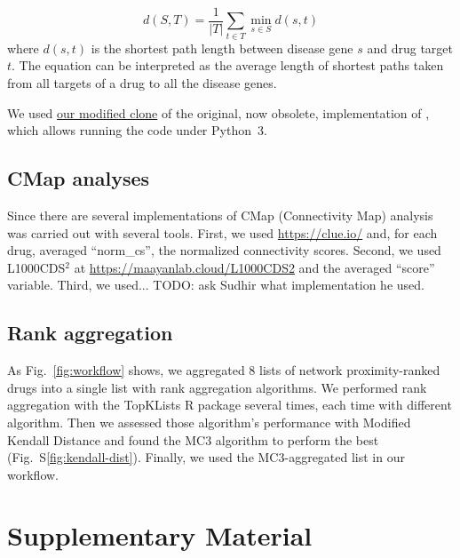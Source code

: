 \documentclass[letterpaper]{article}
\begin{document}
\begin{equation}
  d(S, T) = \frac{1}{|T|}\sum_{t \in T} \min_{s \in S} d(s, t)
\end{equation}
where $d(s,t)$ is the shortest path length between disease gene $s$ and drug
target $t$.  The equation can be interpreted as the average length of shortest
paths taken from all targets of a drug to all the disease genes.

We used \href{https://github.com/attilagk/guney_code}{our modified clone} of
the original, now obsolete, implementation of \cite{Guney2016}, which allows
running the code under Python~3.

\subsection{CMap analyses}

Since there are several implementations of CMap (Connectivity Map) analysis was carried out with several tools.  First, we used
\url{https://clue.io/} \citep{Lamb2006} and, for each drug, averaged
``norm\_cs'',
the normalized connectivity scores.  Second, we used L1000CDS$^2$ at
\url{https://maayanlab.cloud/L1000CDS2} and the averaged ``score'' variable.
Third, we used... TODO: ask Sudhir what implementation he used.

\subsection{Rank aggregation}

As Fig.~\ref{fig:workflow} shows, we aggregated 8 lists of network
proximity-ranked drugs into a single list with rank aggregation algorithms.
We performed rank aggregation with the TopKLists R package
several times, each time with different algorithm.  Then we assessed those
algorithm's performance with Modified Kendall Distance and found the MC3
algorithm to perform the best (Fig.~S\ref{fig:kendall-dist}).  Finally, we
used the MC3-aggregated list in our workflow.



\newpage
\section*{Supplementary Material}

\setcounter{table}{0}
\makeatletter 
\renewcommand{\figurename}{Supplementary Table} %
\makeatother

\setcounter{figure}{0}
\makeatletter 
\renewcommand{\figurename}{Supplementary Figure} %
\makeatother
\end{document}
